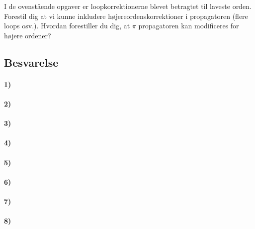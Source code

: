 \documentclass[../main.tex]{subfiles}
\begin{document}
I de ovenstående opgaver er loopkorrektionerne blevet betragtet til laveste orden. Forestil dig at vi kunne inkludere højereordenskorrektioner i propagatoren (flere loops osv.). Hvordan forestiller du dig, at $\pi$ propagatoren kan modificeres for højere ordener?



\subsection{Besvarelse}


\paragraph[1)]{\textbf{1)}}





\paragraph[2)]{\textbf{2)}}





\paragraph[3)]{\textbf{3)}}





\paragraph[4)]{\textbf{4)}}




\paragraph[5)]{\textbf{5)}}





\paragraph[6)]{\textbf{6)}}





\paragraph[7)]{\textbf{7)}}





\paragraph[8)]{\textbf{8)}}




\end{document}
